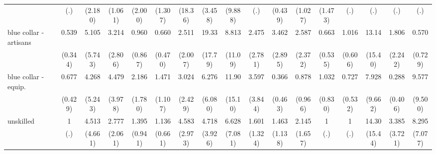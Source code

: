 {\begin{tabular}{l*{16}{c}}
                    &         (.)         &     (2.180)         &     (1.061)         &     (2.000)         &     (1.307)         &     (18.36)         &     (3.458)         &     (9.888)         &         (.)         &     (0.439)         &     (1.027)         &     (1.473)         &         (.)         &         (.)         &         (.)         &         (.)         \\
[1em]
blue collar - artisans&       0.539         &       5.105         &       3.214         &       0.960         &       0.660         &       2.511         &       19.33\sym{**} &       8.813         &       2.475         &       3.462         &       2.587         &       0.663         &       1.016         &       13.14\sym{*}  &       1.806         &       0.570         \\
                    &     (0.344)         &     (5.743)         &     (2.806)         &     (0.867)         &     (0.470)         &     (2.007)         &     (17.79)         &     (11.09)         &     (2.781)         &     (2.895)         &     (2.372)         &     (0.535)         &     (0.606)         &     (15.40)         &     (2.242)         &     (0.729)         \\
[1em]
blue collar - equip.&       0.677         &       4.268         &       4.479         &       2.186         &       1.471         &       3.024         &       6.276         &       11.90         &       3.597         &       0.366         &       0.878         &       1.032         &       0.727         &       7.928         &       0.288         &       9.577\sym{*}  \\
                    &     (0.429)         &     (5.243)         &     (3.978)         &     (1.780)         &     (1.107)         &     (2.429)         &     (6.080)         &     (15.10)         &     (3.844)         &     (0.463)         &     (0.966)         &     (0.830)         &     (0.532)         &     (9.662)         &     (0.406)         &     (9.500)         \\
[1em]
unskilled           &           1         &       4.513         &       2.777         &       1.395         &       1.136         &       4.583\sym{*}  &       4.718         &       6.628         &       1.601         &       1.463         &       2.145         &           1         &           1         &       14.30\sym{*}  &       3.385         &       8.295\sym{*}  \\
                    &         (.)         &     (4.661)         &     (2.061)         &     (0.941)         &     (0.661)         &     (2.973)         &     (3.926)         &     (7.081)         &     (1.324)         &     (1.138)         &     (1.657)         &         (.)         &         (.)         &     (15.44)         &     (3.721)         &     (7.077)         \\

\end{tabular}}
